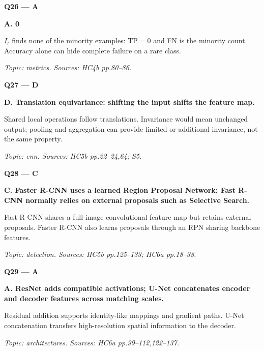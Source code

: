 \documentclass[11pt,a4paper]{article}
\begin{document}
\par\vspace{12pt}
\begin{minipage}{\linewidth}
\textbf{Q26 — A}\par\smallskip
\textbf{A. 0}\par
\(I_t\) finds none of the minority examples: \(\mathrm{TP}=0\) and FN is the minority count. Accuracy alone can hide complete failure on a rare class.\par
{\small\itshape Topic: metrics. Sources: HC4b pp.80–86.}

\end{minipage}
\par\vspace{12pt}
\begin{minipage}{\linewidth}
\textbf{Q27 — D}\par\smallskip
\textbf{D. Translation equivariance: shifting the input shifts the feature map.}\par
Shared local operations follow translations. Invariance would mean unchanged output; pooling and aggregation can provide limited or additional invariance,\allowbreak{} not the same property.\par
{\small\itshape Topic: cnn. Sources: HC5b pp.22–24,\allowbreak{}64; S5.}

\end{minipage}
\par\vspace{12pt}
\begin{minipage}{\linewidth}
\textbf{Q28 — C}\par\smallskip
\textbf{C. Faster R-CNN uses a learned Region Proposal Network; Fast R-CNN normally relies on external proposals such as Selective Search.}\par
Fast R-CNN shares a full-image convolutional feature map but retains external proposals. Faster R-CNN also learns proposals through an RPN sharing backbone features.\par
{\small\itshape Topic: detection. Sources: HC5b pp.125–133; HC6a pp.18–38.}

\end{minipage}
\par\vspace{12pt}
\begin{minipage}{\linewidth}
\textbf{Q29 — A}\par\smallskip
\textbf{A. ResNet adds compatible activations; U-Net concatenates encoder and decoder features across matching scales.}\par
Residual addition supports identity-like mappings and gradient paths. U-Net concatenation transfers high-resolution spatial information to the decoder.\par
{\small\itshape Topic: architectures. Sources: HC6a pp.99–112,\allowbreak{}122–137.}

\end{minipage}
\end{document}
